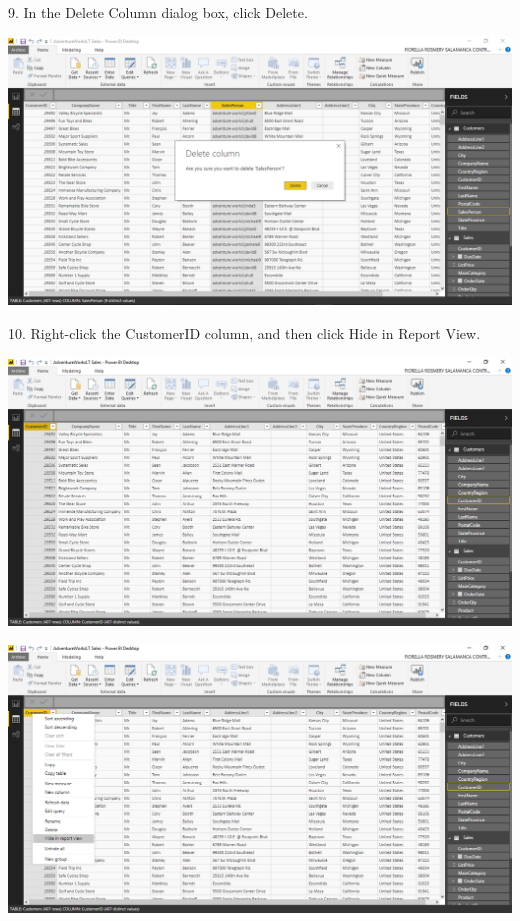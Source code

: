 9. In the Delete Column dialog box, click Delete.\\

	\begin{center}
	\includegraphics[width=17cm]{./Imagenes/Ejercicio1/Tarea3/6}
	\end{center}	

10. Right-click the CustomerID column, and then click Hide in Report View.\\

	\begin{center}
	\includegraphics[width=17cm]{./Imagenes/Ejercicio1/Tarea3/7}
	\end{center}	

	\begin{center}
	\includegraphics[width=17cm]{./Imagenes/Ejercicio1/Tarea3/8}
	\end{center}	


